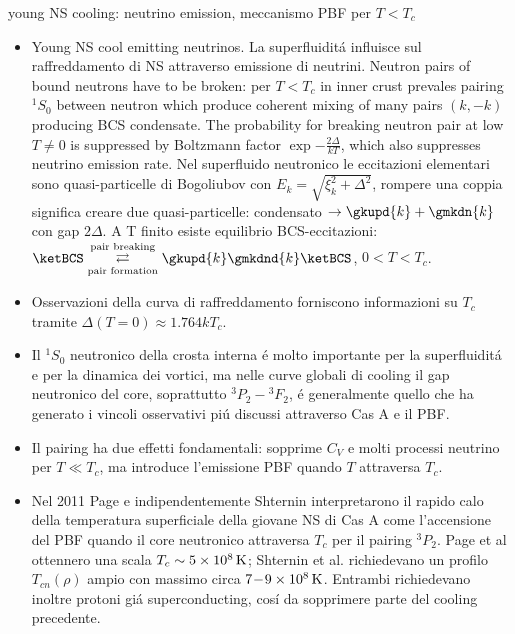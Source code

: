 \begin{frame}{young NS cooling: neutrino emission, meccanismo PBF per $T<T_c$}
    \begin{itemize}
        \item Young NS cool emitting neutrinos. La superfluidit\'a influisce sul raffreddamento di NS attraverso emissione di neutrini. Neutron pairs of bound neutrons have to be broken: per $T<T_c$ in inner crust prevales pairing $^1S_0$ between neutron which produce coherent mixing of many pairs $(k,-k)$ producing BCS condensate. The probability for breaking neutron pair at low $T\neq0$ is suppressed by Boltzmann factor $\exp{-\frac{2\Delta}{kT}}$, which also suppresses neutrino emission rate. Nel superfluido neutronico le eccitazioni elementari sono quasi-particelle di Bogoliubov con $E_k=\sqrt{\xi_k^2+\Delta^2}$, rompere una coppia significa creare due quasi-particelle: condensato $\to\gkupd{k}+\gmkdn{k}$ con gap $2\Delta$. A T finito esiste equilibrio BCS-eccitazioni: $\ketBCS\underset{\text{pair formation}}{\overset{\text{pair breaking}}{\rightleftarrows}}\gkupd{k}\gmkdnd{k}\ketBCS$, $0<T<T_c$. \item Osservazioni della curva di raffreddamento forniscono informazioni su $T_c$ tramite $\Delta(T=0)\approx\num{1.764}kT_c$.
        \item Il \(^{1}S_0\) neutronico della crosta interna \'e  molto importante per la superfluidit\'a e per la dinamica dei vortici, ma nelle curve globali di cooling il gap neutronico del core, soprattutto \(^{3}P_2\!-\!{}^{3}F_2\), \'e generalmente quello che ha generato i vincoli osservativi pi\'u discussi attraverso Cas A e il PBF.
        \item Il pairing ha due effetti fondamentali: sopprime \(C_V\) e molti processi neutrino per \(T\ll T_c\), ma introduce l'emissione PBF quando \(T\) attraversa \(T_c\).
        \item Nel 2011 Page e indipendentemente Shternin interpretarono il rapido calo della temperatura superficiale della giovane NS di Cas A come l'accensione del PBF quando il core neutronico attraversa \(T_c\) per il pairing \(^{3}P_2\). Page et al ottennero una scala \(T_c\sim5\times10^8\,{\rm K}\); Shternin et al. richiedevano un profilo \(T_{cn}(\rho)\) ampio con massimo circa \(7\!-\!9\times10^8\,{\rm K}\). Entrambi richiedevano inoltre protoni gi\'a superconducting, cos\'i da sopprimere parte del cooling precedente.
    \end{itemize}
\end{frame}


